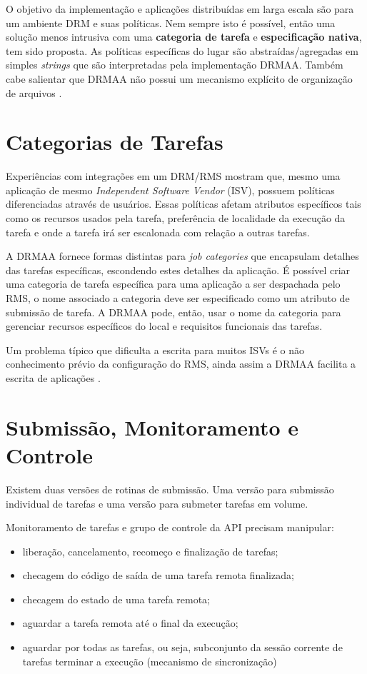 O objetivo da implementação e aplicações distribuídas em larga escala são para um ambiente DRM e suas políticas. Nem sempre isto é possível, então uma solução menos intrusiva com uma {\bf categoria de tarefa} e {\bf especificação nativa}, tem sido proposta. As políticas específicas do lugar são abstraídas/agregadas em simples \emph{strings} que são interpretadas pela implementação DRMAA. Também cabe salientar que DRMAA não possui um mecanismo explícito de organização de arquivos \cite{Rajic2004}.

\section{Categorias de Tarefas}

Experiências com integrações em um DRM/RMS mostram que, mesmo uma aplicação de mesmo \emph{Independent Software Vendor} (ISV), possuem políticas diferenciadas através de usuários. Essas políticas afetam atributos específicos tais como os recursos usados pela tarefa, preferência de localidade da execução da tarefa e onde a tarefa irá ser escalonada com relação a outras tarefas.

A DRMAA fornece formas distintas para \emph{job categories} que encapsulam detalhes das tarefas específicas, escondendo estes detalhes da aplicação. É possível criar uma categoria de tarefa específica para uma aplicação a ser despachada pelo RMS, o nome associado a categoria deve ser especificado como um atributo de submissão de tarefa. A DRMAA pode, então, usar o nome da categoria para gerenciar recursos específicos do local e requisitos funcionais das tarefas.

Um problema típico que dificulta a escrita para muitos ISVs é o não conhecimento prévio da configuração do RMS, ainda assim a DRMAA facilita a escrita de aplicações \cite{Rajic2002}.

\section{Submissão, Monitoramento e Controle}

Existem duas versões de rotinas de submissão. Uma versão para submissão individual de tarefas e uma versão para submeter tarefas em volume. 

Monitoramento de tarefas e grupo de controle da API precisam manipular:
\begin{itemize}
	\item liberação, cancelamento, recomeço e finalização de tarefas;
	\item checagem do código de saída de uma tarefa remota finalizada;
	\item checagem do estado de uma tarefa remota;
	\item aguardar a tarefa remota até o final da execução;
	\item aguardar por todas as tarefas, ou seja, subconjunto da sessão corrente de tarefas terminar a execução (mecanismo de sincronização)
\end{itemize}

